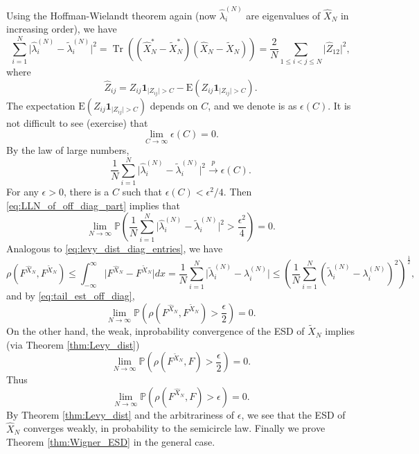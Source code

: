 \documentclass[11pt, a4paper]{article}
\numberwithin{equation}{section}
\newcommand{\E}{\mathrm{E}}
\newcommand{\id}{\mathbf{1}}
\newcommand{\toprobab}{\stackrel{p}{\rightarrow}}
\newcommand{\Prob}{\mathbb{P}}
\DeclareMathOperator{\Tr}{Tr}
\theoremstyle{definition}
\theoremstyle{remark}
\begin{document}
Using the Hoffman-Wielandt theorem again (now $\hat{\lambda}^{(N)}_i$ are eigenvalues of $\hat{X}_N$ in increasing order), we have
\begin{equation}
  \sum^N_{i = 1} \lvert \hat{\lambda}^{(N)}_i - \tilde{\lambda}^{(N)}_i \rvert^2 = \Tr((\hat{X}^*_N - \tilde{X}^*_N)(\hat{X}_N - \tilde{X}_N)) = \frac{2}{N} \sum_{1 \leq i < j \leq N} \lvert \hat{Z}_{12} \rvert^2,
\end{equation}
where
\begin{equation}
  \hat{Z}_{ij} = Z_{ij} \id_{\lvert Z_{ij} \rvert > C} - \E(Z_{ij} \id_{\lvert Z_{ij} \rvert > C}).
\end{equation}
The expectation $\E(Z_{ij} \id_{\lvert Z_{ij} \rvert > C})$ depends on $C$, and we denote is as $\epsilon(C)$. It is not difficult to see (exercise) that
\begin{equation}
  \lim_{C \to \infty} \epsilon(C) = 0.
\end{equation}
By the law of large numbers,
\begin{equation} \label{eq:LLN_of_off_diag_part}
  \frac{1}{N} \sum^N_{i = 1} \lvert \hat{\lambda}^{(N)}_i - \tilde{\lambda}^{(N)}_i \rvert^2 \toprobab \epsilon(C).
\end{equation}
For any $\epsilon > 0$, there is a $C$ such that $\epsilon(C) < \epsilon^2/4$. Then \eqref{eq:LLN_of_off_diag_part} implies that
\begin{equation} \label{eq:tail_est_off_diag}
  \lim_{N \to \infty} \Prob \left( \frac{1}{N} \sum^N_{i = 1} \lvert \hat{\lambda}^{(N)}_i - \tilde{\lambda}^{(N)}_i \rvert^2 > \frac{\epsilon^2}{4} \right) = 0.
\end{equation}
Analogous to \eqref{eq:levy_dist_diag_entries}, we have 
\begin{equation}
  \rho(F^{\hat{X}_N}, F^{\tilde{X}_N}) \leq \int^{\infty}_{-\infty} \lvert F^{\hat{X}_N} - F^{\tilde{X}_N} \rvert dx = \frac{1}{N} \sum^N_{i = 1} \lvert \tilde{\lambda}^{(N)}_i - \lambda^{(N)}_i \rvert \leq \left( \frac{1}{N} \sum^N_{i = 1} (\tilde{\lambda}^{(N)}_i - \lambda^{(N)}_i)^2 \right)^{\frac{1}{2}},
\end{equation}
and by \eqref{eq:tail_est_off_diag},
\begin{equation}
  \lim_{N \to \infty} \Prob \left( \rho(F^{\hat{X}_N}, F^{\tilde{X}_N}) > \frac{\epsilon}{2} \right) = 0.
\end{equation}
On the other hand, the weak, inprobability convergence of the ESD of $\tilde{X}_N$ implies (via Theorem \ref{thm:Levy_dist})
\begin{equation}
  \lim_{N \to \infty} \Prob \left( \rho(F^{\tilde{X}_N}, F) > \frac{\epsilon}{2} \right) = 0.
\end{equation}
Thus 
\begin{equation}
  \lim_{N \to \infty} \Prob \left( \rho(F^{\hat{X}_N}, F) > \epsilon \right) = 0.
\end{equation}
By Theorem \ref{thm:Levy_dist} and the arbitrariness of $\epsilon$, we see that the ESD of $\hat{X}_N$ converges weakly, in probability to the semicircle law. Finally we prove Theorem \ref{thm:Wigner_ESD} in the general case.
\end{document}
